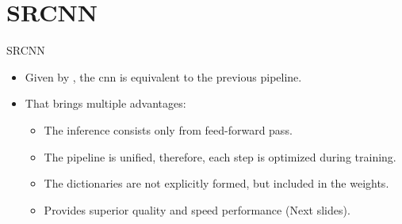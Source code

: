 \documentclass[hyperref={unicode}, xcolor=dvipsnames, t]{beamer}
\begin{document}
\section{SRCNN}
\begin{frame}{SRCNN}
    \begin{itemize}
        \item Given by \textcite{srcnn}, the \gls{cnn} is \alert{equivalent} to the previous pipeline.
        \item That brings multiple advantages:
        \begin{itemize}
            \item The inference consists only from \alert{feed-forward pass}.
            \item The pipeline is unified, therefore, each step is optimized during training.
            \item The dictionaries are not explicitly formed, but included in the weights.
            \item Provides \alert{superior quality and speed performance} (Next slides).
        \end{itemize}
    \end{itemize}
\end{frame}
\end{document}
